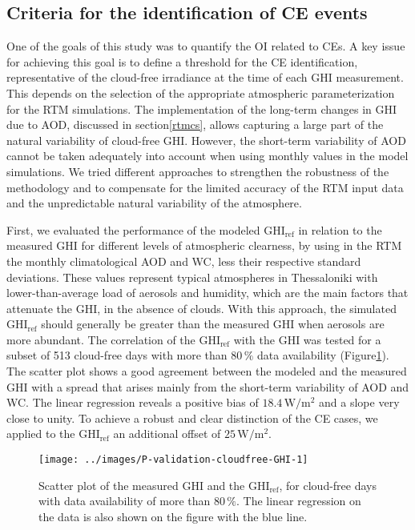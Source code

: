 \documentclass[preprint, 5p,
authoryear]{elsarticle} %
\begin{document}
\hypertarget{criteria-for-the-identification-of-ce-events}{%
\subsection{Criteria for the identification of CE
events}\label{criteria-for-the-identification-of-ce-events}}

One of the goals of this study was to quantify the OI related to CEs. A
key issue for achieving this goal is to define a threshold for the CE
identification, representative of the cloud-free irradiance at the time
of each GHI measurement. This depends on the selection of the
appropriate atmospheric parameterization for the RTM simulations. The
implementation of the long-term changes in GHI due to AOD, discussed in
section\nobreakspace{}\ref{rtmcs}, allows capturing a large part of the
natural variability of cloud-free GHI. However, the short-term
variability of AOD cannot be taken adequately into account when using
monthly values in the model simulations. We tried different approaches
to strengthen the robustness of the methodology and to compensate for
the limited accuracy of the RTM input data and the unpredictable natural
variability of the atmosphere.

First, we evaluated the performance of the modeled
\(\text{GHI}_\text{ref}\) in relation to the measured GHI for different
levels of atmospheric clearness, by using in the RTM the monthly
climatological AOD and WC, less their respective standard deviations.
These values represent typical atmospheres in Thessaloniki with
lower-than-average load of aerosols and humidity, which are the main
factors that attenuate the GHI, in the absence of clouds. With this
approach, the simulated \(\text{GHI}_\text{ref}\) should generally be
greater than the measured GHI when aerosols are more abundant. The
correlation of the \(\text{GHI}_\text{ref}\) with the GHI was tested for
a subset of 513 cloud-free days with more than \(80\,\%\) data
availability (Figure\nobreakspace{}\ref{fig:validation-GHI}). The
scatter plot shows a good agreement between the modeled and the measured
GHI with a spread that arises mainly from the short-term variability of
AOD and WC. The linear regression reveals a positive bias of
\(18.4\,\text{W}/\text{m}^2\) and a slope very close to unity. To
achieve a robust and clear distinction of the CE cases, we applied to
the \(\text{GHI}_\text{ref}\) an additional offset of
\(25\,\text{W}/\text{m}^2\).

\begin{figure}[H]

{\centering \texttt{[image: ../images/P-validation-cloudfree-GHI-1]} 

}

\caption{Scatter plot of the measured GHI and the $\text{GHI}_\text{ref}$, for cloud-free days with data availability of more than $80\,\%$. The linear regression on the data is also shown on the figure with the blue line.}\label{fig:validation-GHI}
\end{figure}
\end{document}
